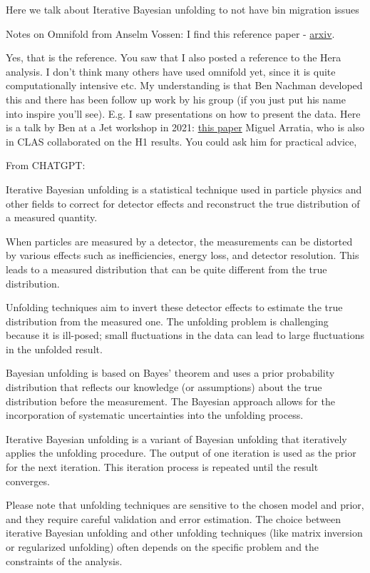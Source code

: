 Here we talk about Iterative Bayesian unfolding to not have bin migration issues

Notes on Omnifold from Anselm Vossen:
I find this reference paper - \href{https://arxiv.org/pdf/1911.09107.pdf}{arxiv}.




Yes, that is the reference. You saw that I also posted a reference to the Hera analysis. I don’t think many others have used omnifold yet, since it is quite computationally intensive etc.
My understanding is that Ben Nachman developed this and there has been follow up work by his group (if you just put his name into inspire you’ll see). E.g. I saw presentations on how to present the data. Here is a talk by Ben at a Jet workshop in 2021: \href{https://indico.bnl.gov/event/10555/contributions/54721/attachments/37368/61570/H1Measurement_EICWorkshopSeptember2021.pdf}{this paper}
 Miguel Arratia, who is also in CLAS collaborated on the H1 results. You could ask him for practical advice,

From CHATGPT:


Iterative Bayesian unfolding is a statistical technique used in particle physics and other fields to correct for detector effects and reconstruct the true distribution of a measured quantity.

When particles are measured by a detector, the measurements can be distorted by various effects such as inefficiencies, energy loss, and detector resolution. This leads to a measured distribution that can be quite different from the true distribution.

Unfolding techniques aim to invert these detector effects to estimate the true distribution from the measured one. The unfolding problem is challenging because it is ill-posed; small fluctuations in the data can lead to large fluctuations in the unfolded result.

Bayesian unfolding is based on Bayes' theorem and uses a prior probability distribution that reflects our knowledge (or assumptions) about the true distribution before the measurement. The Bayesian approach allows for the incorporation of systematic uncertainties into the unfolding process.

Iterative Bayesian unfolding is a variant of Bayesian unfolding that iteratively applies the unfolding procedure. The output of one iteration is used as the prior for the next iteration. This iteration process is repeated until the result converges.

Please note that unfolding techniques are sensitive to the chosen model and prior, and they require careful validation and error estimation. The choice between iterative Bayesian unfolding and other unfolding techniques (like matrix inversion or regularized unfolding) often depends on the specific problem and the constraints of the analysis.